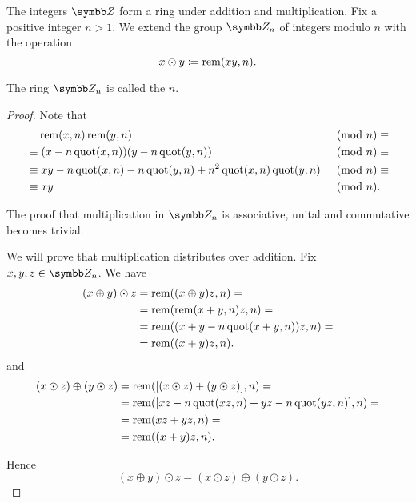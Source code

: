 \begin{definition}\label{def:ring_of_integers_modulo}
  The integers \( \Z \) form a ring under addition and multiplication. Fix a positive integer \( n > 1 \). We extend the group \( \Z_n \) of integers modulo \( n \) with the operation
  \begin{equation*}
    x \odot y \coloneqq \operatorname{rem}(xy, n).
  \end{equation*}

  The ring \( \Z_n \) is called the  \( n \).
\end{definition}
\begin{proof}
  Note that
  \begin{align*}
    &\phantom{\equiv}\; \operatorname{rem}(x, n) \operatorname{rem}(y, n)
    &\pmod n \equiv \\ &\equiv
    (x - n \operatorname{quot}(x, n)) (y - n \operatorname{quot}(y, n))
    &\pmod n \equiv \\ &\equiv
    xy - n \operatorname{quot}(x, n) - n \operatorname{quot}(y, n) + n^2 \operatorname{quot}(x, n) \operatorname{quot}(y, n)
    &\pmod n \equiv \\ &\equiv
    xy
    &\pmod n. \phantom{\equiv}
  \end{align*}

  The proof that multiplication in \( \Z_n \) is associative, unital and commutative becomes trivial.

  We will prove that multiplication distributes over addition. Fix \( x, y, z \in \Z_n \). We have
  \begin{align*}
    (x \oplus y) \odot z
    &=
    \operatorname{rem}((x \oplus y) z, n)
    = \\ &=
    \operatorname{rem}(\operatorname{rem}(x + y, n) z, n)
    = \\ &=
    \operatorname{rem}((x + y - n \operatorname{quot}(x + y, n)) z, n)
    = \\ &=
    \operatorname{rem}((x + y)z, n).
  \end{align*}
  and
  \begin{align*}
    (x \odot z) \oplus (y \odot z)
    &=
    \operatorname{rem}([(x \odot z) + (y \odot z)], n)
    = \\ &=
    \operatorname{rem}([xz - n \operatorname{quot}(xz, n) + yz - n \operatorname{quot}(yz, n)], n)
    = \\ &=
    \operatorname{rem}(xz + yz, n)
    = \\ &=
    \operatorname{rem}((x + y)z, n).
  \end{align*}

  Hence
  \begin{equation*}
    (x \oplus y) \odot z = (x \odot z) \oplus (y \odot z).
  \end{equation*}
\end{proof}

